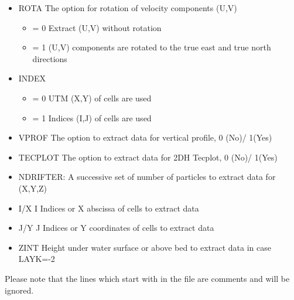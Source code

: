 \documentclass[letterpaper,10pt,english]{sphinxmanual}
\begin{document}
\begin{itemize}
\item {} 
ROTA The option for rotation of velocity components (U,V)
\begin{itemize}
\item {} 
= 0  Extract (U,V) without rotation

\item {} 
= 1  (U,V) components are rotated to the true east and true north directions

\end{itemize}

\item {} 
INDEX
\begin{itemize}
\item {} 
= 0 UTM (X,Y) of cells are used

\item {} 
= 1 Indices (I,J) of cells are used

\end{itemize}

\item {} 
VPROF The option to extract data for vertical profile, 0 (No)/ 1(Yes)

\item {} 
TECPLOT The option to extract data for 2DH Tecplot, 0 (No)/ 1(Yes)

\item {} 
NDRIFTER: A successive set of number of particles to extract data for (X,Y,Z)

\item {} 
I/X I Indices or X abscissa of cells to extract data

\item {} 
J/Y J Indices or Y coordinates of cells to extract data

\item {} 
ZINT Height under water surface or above bed to extract data in case LAYK=-2

\end{itemize}

Please note that the lines which start with \sphinxtitleref{**} in the  file are comments and
will be ignored.
\end{document}
